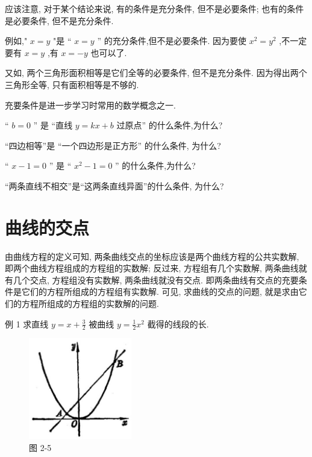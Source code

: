 \documentclass[lang=cn,newtx,10.5pt,scheme=chinese]{elegantbook}
\begin{document}
应该注意, 对于某个结论来说, 有的条件是充分条件, 但不是必要条件; 也有的条件是必要条件, 但不是充分条件.

例如," \(x = y\) "是 “ \(x = y\) ” 的充分条件,但不是必要条件. 因为要使 \({x}^{2} = {y}^{2}\) ,不一定要有 \(x = y\) ,有 \(x = - y\) 也可以了.

又如, 两个三角形面积相等是它们全等的必要条件, 但不是充分条件. 因为得出两个三角形全等, 只有面积相等是不够的.

充要条件是进一步学习时常用的数学概念之一.

\begin{problemset}[练习]

\item “ \(b = 0\) ” 是 “直线 \(y = {kx} + b\) 过原点” 的什么条件,为什么?

\item “四边相等”是 “一个四边形是正方形” 的什么条件, 为什么?

\item “ \(x - 1 = 0\) ” 是 “ \({x}^{2} - 1 = 0\) ” 的什么条件,为什么?

\item “两条直线不相交”是“这两条直线异面”的什么条件, 为什么?
\end{problemset}

\section{曲线的交点}

由曲线方程的定义可知, 两条曲线交点的坐标应该是两个曲线方程的公共实数解, 即两个曲线方程组成的方程组的实数解; 反过来, 方程组有几个实数解, 两条曲线就有几个交点, 方程组没有实数解, 两条曲线就没有交点. 即两条曲线有交点的充要条件是它们的方程所组成的方程组有实数解. 可见, 求曲线的交点的问题, 就是求由它们的方程所组成的方程组的实数解的问题.

例 1 求直线 \(y = x + \frac{3}{2}\) 被曲线 \(y = \frac{1}{2}{x}^{2}\) 截得的线段的长.

\begin{figure}[h]
  \centering
  \includegraphics[max width=0.4\textwidth]{images/01912cc2-ffb6-728e-9ae7-b113ff05c64b_74_639219.jpg}
  \caption{图 2-5}
\end{figure}
\end{document}
